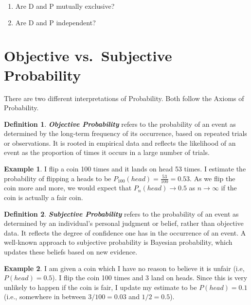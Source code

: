\documentclass[
  11pt,
  oneside]{book}
\theoremstyle{definition}
\newtheorem{definition}{Definition}[chapter]
\theoremstyle{definition}
\newtheorem{example}{Example}[chapter]
\theoremstyle{definition}
\theoremstyle{definition}
\theoremstyle{remark}
\begin{document}
\begin{enumerate}
\def\labelenumi{(\alph{enumi})}
\item
  Are D and P mutually exclusive?
  \vfill
\item
  Are D and P independent?
  \vfill
\end{enumerate}

\section{Objective vs.~Subjective Probability}\label{objective-vs.-subjective-probability}

There are two different interpretations of Probability. Both follow the Axioms of Probability.

\begin{definition}
\textbf{\emph{Objective Probability}} refers to the probability of an event as determined by the long-term frequency of its occurrence, based on repeated trials or observations. It is rooted in empirical data and reflects the likelihood of an event as the proportion of times it occurs in a large number of trials.
\end{definition}

\begin{example}
I flip a coin 100 times and it lands on head 53 times. I estimate the probability of flipping a heads to be \(P_{100}(head) = \frac{53}{100} = 0.53\). As we flip the coin more and more, we would expect that \(P_n(head) \to 0.5\) as \(n \to \infty\) if the coin is actually a fair coin.
\end{example}

\begin{definition}
\textbf{\emph{Subjective Probability}} refers to the probability of an event as determined by an individual's personal judgment or belief, rather than objective data. It reflects the degree of confidence one has in the occurrence of an event. A well-known approach to subjective probability is Bayesian probability, which updates these beliefs based on new evidence.
\end{definition}

\begin{example}
I am given a coin which I have no reason to believe it is unfair (i.e, \(P(head) = 0.5\)). I flip the coin 100 times and 3 land on heads. Since this is very unlikely to happen if the coin is fair, I update my estimate to be \(P(head)=0.1\) (i.e., somewhere in between \(3/100=0.03\) and \(1/2 = 0.5\)).
\end{example}
\end{document}
